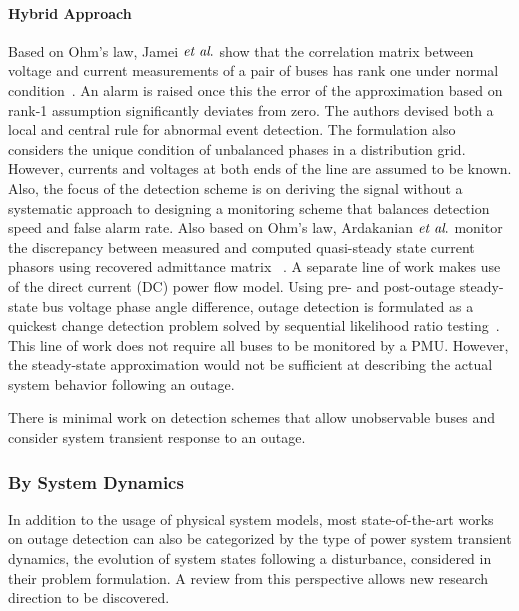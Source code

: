 \paragraph{Hybrid Approach}
Based on Ohm's law, Jamei $\textit{et al}.$ show that the correlation matrix between voltage and current measurements of a pair of buses has rank one under normal condition~\cite{Jamei2017a}. An alarm is raised once this the error of the approximation based on rank-1 assumption significantly deviates from zero. The authors devised both a local and central rule for abnormal event detection. The formulation also considers the unique condition of unbalanced phases in a distribution grid. However, currents and voltages at both ends of the line are assumed to be known. Also, the focus of the detection scheme is on deriving the signal without a systematic approach to designing a monitoring scheme that balances detection speed and false alarm rate.
Also based on Ohm's law, Ardakanian $\textit{et al}.$ monitor the discrepancy between measured and computed quasi-steady state current phasors using recovered admittance matrix ~\cite{Ardakanian2019a}. 
A separate line of work makes use of the direct current (DC) power flow model. Using pre- and post-outage steady-state bus voltage phase angle difference, outage detection is formulated as a quickest change detection problem solved by sequential likelihood ratio testing~\cite{Chen2016,Babakmehr2016}. 
This line of work does not require all buses to be monitored by a PMU. However, the steady-state approximation would not be sufficient at describing the actual system behavior following an outage.

There is minimal work on detection schemes that allow unobservable buses and consider system transient response to an outage. 


\subsubsection{By System Dynamics} %
\label{ssub:by_dynamics}

In addition to the usage of physical system models, most state-of-the-art works on outage detection can also be categorized by the type of power system transient dynamics, the evolution of system states following a disturbance, considered in their problem formulation. A review from this perspective allows new research direction to be discovered. 

